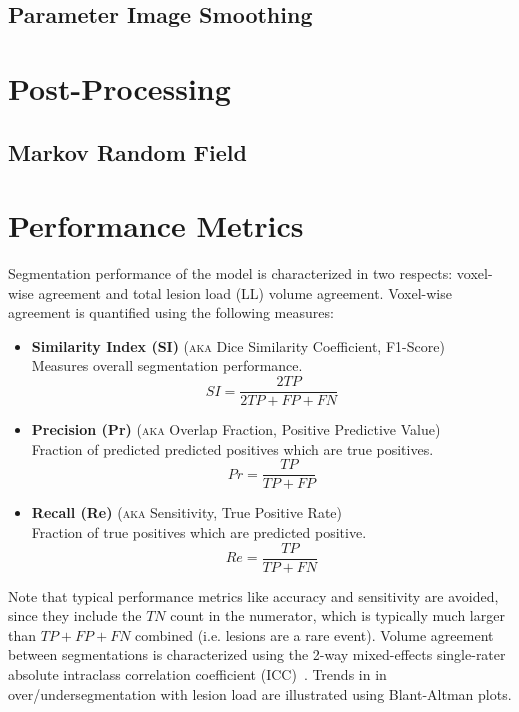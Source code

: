 \subsection{Parameter Image Smoothing}

\section{Post-Processing}
\subsection{Markov Random Field}
\section{Performance Metrics}
\label{ss:metrics}
Segmentation performance of the model is characterized in two respects: voxel-wise agreement and total lesion load (LL) volume agreement. Voxel-wise agreement is quantified using the following measures:
\begin{itemize}
  \item \textbf{Similarity Index (SI)} (\textsc{aka} Dice Similarity Coefficient, F1-Score)\\Measures overall segmentation performance.
  \begin{equation}SI = \dfrac{2TP}{2TP + FP + FN}\end{equation}
  \item \textbf{Precision (Pr)} (\textsc{aka} Overlap Fraction, Positive Predictive Value)\\Fraction of predicted predicted positives which are true positives.
  \begin{equation}Pr = \dfrac{TP}{TP+FP}\end{equation}
  \item \textbf{Recall (Re)} (\textsc{aka} Sensitivity, True Positive Rate)\\Fraction of true positives which are predicted positive.
  \begin{equation}Re = \dfrac{TP}{TP+FN}\end{equation}
\end{itemize}
Note that typical performance metrics like accuracy and sensitivity are avoided, since they include the $TN$ count in the numerator, which is typically much larger than $TP + FP + FN$ combined (i.e. lesions are a rare event). Volume agreement between segmentations is characterized using the 2-way mixed-effects single-rater absolute intraclass correlation coefficient (ICC)\footnotemark\ \cite{Koo2016}. Trends in in over/undersegmentation with lesion load are illustrated using Blant-Altman plots.

